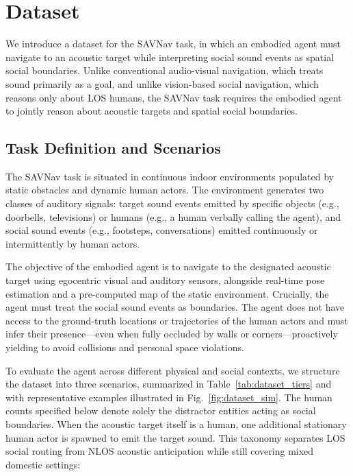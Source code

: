 \section{Dataset}
\label{sec:dataset}

We introduce a dataset for the SAVNav task, in which an embodied agent must navigate to an acoustic target while interpreting social sound events as spatial social boundaries. Unlike conventional audio-visual navigation, which treats sound primarily as a goal, and unlike vision-based social navigation, which reasons only about LOS humans, the SAVNav task requires the embodied agent to jointly reason about acoustic targets and spatial social boundaries.

\subsection{Task Definition and Scenarios}
\label{subsec:dataset-task}

The SAVNav task is situated in continuous indoor environments populated by static obstacles and dynamic human actors. The environment generates two classes of auditory signals: target sound events emitted by specific objects (e.g., doorbells, televisions) or humans (e.g., a human verbally calling the agent), and social sound events (e.g., footsteps, conversations) emitted continuously or intermittently by human actors.

The objective of the embodied agent is to navigate to the designated acoustic target using egocentric visual and auditory sensors, alongside real-time pose estimation and a pre-computed map of the static environment. Crucially, the agent must treat the social sound events as boundaries. The agent does not have access to the ground-truth locations or trajectories of the human actors and must infer their presence---even when fully occluded by walls or corners---proactively yielding to avoid collisions and personal space violations.

To evaluate the agent across different physical and social contexts, we structure the dataset into three scenarios, summarized in Table~\ref{tab:dataset_tiers} and with representative examples illustrated in Fig.~\ref{fig:dataset_sim}. The human counts specified below denote solely the distractor entities acting as social boundaries. When the acoustic target itself is a human, one additional stationary human actor is spawned to emit the target sound. This taxonomy separates LOS social routing from NLOS acoustic anticipation while still covering mixed domestic settings:

